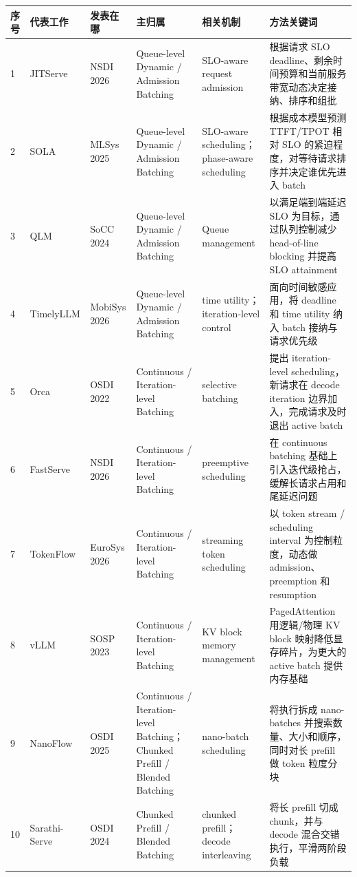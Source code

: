 \documentclass[a4paper,10pt]{ctexart}
\begin{document}
\begin{table}[H]
\centering
\scriptsize
\setlength{\tabcolsep}{3pt}
\renewcommand{\arraystretch}{1.15}
\begin{tabularx}{\textwidth}{|X|X|X|X|X|X|}
\hline
\textbf{序号} & \textbf{代表工作} & \textbf{发表在哪} & \textbf{主归属} & \textbf{相关机制} & \textbf{方法关键词} \\ \hline
1 & JITServe & NSDI 2026 & Queue-level Dynamic / Admission Batching & SLO-aware request admission & 根据请求 SLO deadline、剩余时间预算和当前服务带宽动态决定接纳、排序和组批 \\ \hline
2 & SOLA & MLSys 2025 & Queue-level Dynamic / Admission Batching & SLO-aware scheduling；phase-aware scheduling & 根据成本模型预测 TTFT/TPOT 相对 SLO 的紧迫程度，对等待请求排序并决定谁优先进入 batch \\ \hline
3 & QLM & SoCC 2024 & Queue-level Dynamic / Admission Batching & Queue management & 以满足端到端延迟 SLO 为目标，通过队列控制减少 head-of-line blocking 并提高 SLO attainment \\ \hline
4 & TimelyLLM & MobiSys 2026 & Queue-level Dynamic / Admission Batching & time utility；iteration-level control & 面向时间敏感应用，将 deadline 和 time utility 纳入 batch 接纳与请求优先级 \\ \hline
5 & Orca & OSDI 2022 & Continuous / Iteration-level Batching & selective batching & 提出 iteration-level scheduling，新请求在 decode iteration 边界加入，完成请求及时退出 active batch \\ \hline
6 & FastServe & NSDI 2026 & Continuous / Iteration-level Batching & preemptive scheduling & 在 continuous batching 基础上引入迭代级抢占，缓解长请求占用和尾延迟问题 \\ \hline
7 & TokenFlow & EuroSys 2026 & Continuous / Iteration-level Batching & streaming token scheduling & 以 token stream / scheduling interval 为控制粒度，动态做 admission、preemption 和 resumption \\ \hline
8 & vLLM & SOSP 2023 & Continuous / Iteration-level Batching & KV block memory management & PagedAttention 用逻辑/物理 KV block 映射降低显存碎片，为更大的 active batch 提供内存基础 \\ \hline
9 & NanoFlow & OSDI 2025 & Continuous / Iteration-level Batching；Chunked Prefill / Blended Batching & nano-batch scheduling & 将执行拆成 nano-batches 并搜索数量、大小和顺序，同时对长 prefill 做 token 粒度分块 \\ \hline
10 & Sarathi-Serve & OSDI 2024 & Chunked Prefill / Blended Batching & chunked prefill；decode interleaving & 将长 prefill 切成 chunk，并与 decode 混合交错执行，平滑两阶段负载 \\ \hline

\end{tabularx}
\end{table}
\end{document}

